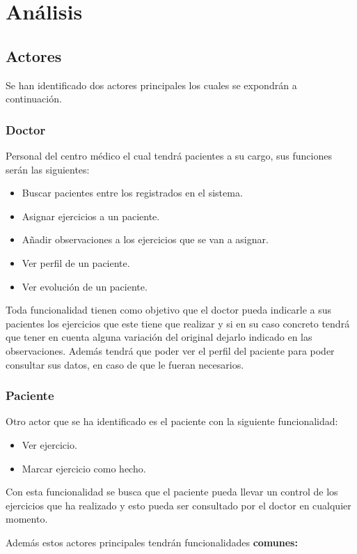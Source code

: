 \section{Análisis}
\subsection{Actores}
Se han identificado dos actores principales los cuales se expondrán a continuación.

\subsubsection{Doctor}
Personal del centro médico el cual tendrá pacientes a su cargo, sus funciones serán
las siguientes:
\begin{itemize}
    \item Buscar pacientes entre los registrados en el sistema.
    \item Asignar ejercicios a un paciente.
    \item Añadir observaciones a los ejercicios que se van a asignar.
    \item Ver perfil de un paciente.
    \item Ver evolución de un paciente.
\end{itemize}

Toda funcionalidad tienen como objetivo que el doctor pueda indicarle a sus
pacientes los ejercicios que este tiene que realizar y si en su caso concreto tendrá
que tener en cuenta alguna variación del original dejarlo indicado en las observaciones.
Además tendrá que poder ver el perfil del paciente para poder consultar sus datos, en caso
de que le fueran necesarios.

\subsubsection{Paciente}
Otro actor que se ha identificado es el paciente con la siguiente funcionalidad:
\begin{itemize}
    \item Ver ejercicio.
    \item Marcar ejercicio como hecho.
\end{itemize}

Con esta funcionalidad se busca que el paciente pueda llevar un control de los ejercicios
que ha realizado y esto pueda ser consultado por el doctor en cualquier momento.

\medskip
Además estos actores principales tendrán funcionalidades \textbf{comunes:}

